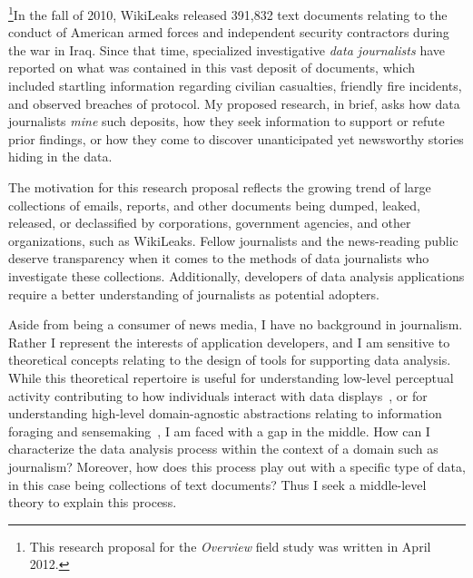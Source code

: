 
\footnote{This research proposal for the {\it Overview} field study was written in April 2012.}In the fall of 2010, WikiLeaks released 391,832 text documents relating to the conduct of American armed forces and independent security contractors during the war in Iraq. 
Since that time, specialized investigative {\it data journalists} have reported on what was contained in this vast deposit of documents, which included startling information regarding civilian casualties, friendly fire incidents, and observed breaches of protocol. 
My proposed research, in brief, asks how data journalists {\it mine} such deposits, how they seek information to support or refute prior findings, or how they come to discover unanticipated yet newsworthy stories hiding in the data.

The motivation for this research proposal reflects the growing trend of large collections of emails, reports, and other documents being dumped, leaked, released, or declassified by corporations, government agencies, and other organizations, such as WikiLeaks. 
Fellow journalists and the news-reading public deserve transparency when it comes to the methods of data journalists who investigate these collections. 
Additionally, developers of data analysis applications require a better understanding of journalists as potential adopters.

Aside from being a consumer of news media, I have no background in journalism. 
Rather I represent the interests of application developers, and I am sensitive to theoretical concepts relating to the design of tools for supporting data analysis.
While this theoretical repertoire is useful for understanding low-level perceptual activity contributing to how individuals interact with data displays~\cite{Amar2005,Shneiderman1996}, or for understanding high-level domain-agnostic abstractions relating to information foraging and sensemaking~\cite{Amar2004,Pirolli2009}, I am faced with a gap in the middle. 
How can I characterize the data analysis process within the context of a domain such as journalism? 
Moreover, how does this process play out with a specific type of data, in this case being collections of text documents? 
Thus I seek a middle-level theory to explain this process.

